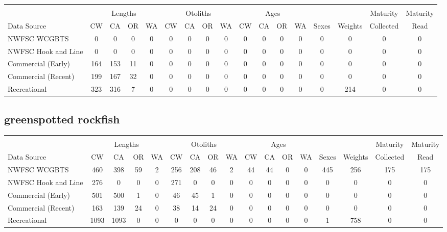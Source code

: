 \documentclass[12pt,]{article}
\begin{document}
\begin{table}[ht]
\centering
\begingroup\fontsize{10pt}{10pt}\selectfont
\begin{tabular}{|l|cccc|cccc|cccc|c|c|c|c|}
  \hline
 &  &  &  &  &  &  &  &  &  &  &  &  &  &  &  &  \\ 
   & \multicolumn{4}{c}{Lengths} &  \multicolumn{4}{c}{Otoliths} & \multicolumn{4}{c}{Ages} &  & & Maturity & Maturity\\
 Data Source & CW & CA & OR & WA & CW & CA & OR & WA & CW & CA & OR & WA & Sexes & Weights & Collected & Read\\
 \hline
NWFSC WCGBTS & 0 & 0 & 0 & 0 & 0 & 0 & 0 & 0 & 0 & 0 & 0 & 0 & 0 & 0 & 0 & 0 \\ 
  NWFSC Hook and Line & 0 & 0 & 0 & 0 & 0 & 0 & 0 & 0 & 0 & 0 & 0 & 0 & 0 & 0 & 0 & 0 \\ 
  Commercial (Early) & 164 & 153 & 11 & 0 & 0 & 0 & 0 & 0 & 0 & 0 & 0 & 0 & 0 & 0 & 0 & 0 \\ 
  Commercial (Recent) & 199 & 167 & 32 & 0 & 0 & 0 & 0 & 0 & 0 & 0 & 0 & 0 & 0 & 0 & 0 & 0 \\ 
  Recreational & 323 & 316 & 7 & 0 & 0 & 0 & 0 & 0 & 0 & 0 & 0 & 0 & 0 & 214 & 0 & 0 \\ 
   \hline
\end{tabular}
\endgroup
\end{table}

\FloatBarrier  

\newpage  

\subsection{greenspotted rockfish}\label{greenspotted-rockfish}

\begin{table}[ht]
\centering
\begingroup\fontsize{10pt}{10pt}\selectfont
\begin{tabular}{|l|cccc|cccc|cccc|c|c|c|c|}
  \hline
 &  &  &  &  &  &  &  &  &  &  &  &  &  &  &  &  \\ 
   & \multicolumn{4}{c}{Lengths} &  \multicolumn{4}{c}{Otoliths} & \multicolumn{4}{c}{Ages} &  & & Maturity & Maturity\\
 Data Source & CW & CA & OR & WA & CW & CA & OR & WA & CW & CA & OR & WA & Sexes & Weights & Collected & Read\\
 \hline
NWFSC WCGBTS & 460 & 398 & 59 & 2 & 256 & 208 & 46 & 2 & 44 & 44 & 0 & 0 & 445 & 256 & 175 & 175 \\ 
  NWFSC Hook and Line & 276 & 0 & 0 & 0 & 271 & 0 & 0 & 0 & 0 & 0 & 0 & 0 & 0 & 0 & 0 & 0 \\ 
  Commercial (Early) & 501 & 500 & 1 & 0 & 46 & 45 & 1 & 0 & 0 & 0 & 0 & 0 & 0 & 0 & 0 & 0 \\ 
  Commercial (Recent) & 163 & 139 & 24 & 0 & 38 & 14 & 24 & 0 & 0 & 0 & 0 & 0 & 0 & 0 & 0 & 0 \\ 
  Recreational & 1093 & 1093 & 0 & 0 & 0 & 0 & 0 & 0 & 0 & 0 & 0 & 0 & 1 & 758 & 0 & 0 \\ 
   \hline
\end{tabular}
\endgroup
\end{table}
\end{document}

